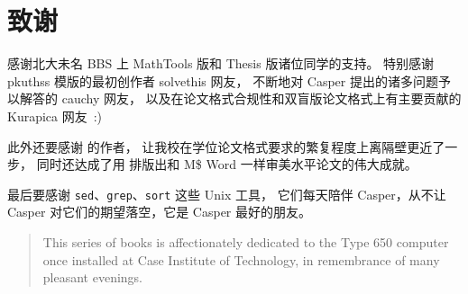 %
%
%
%

\chapter{致谢}

感谢北大未名 BBS 上 MathTools 版和 Thesis 版诸位同学的支持。
特别感谢 pkuthss 模版的最初创作者 solvethis 网友，
不断地对 Casper 提出的诸多问题予以解答的 cauchy 网友，
以及在论文格式合规性和双盲版论文格式上有主要贡献的 Kurapica 网友~:)

此外还要感谢 \parencite{pku-thesisstyle} 的作者，
让我校在学位论文格式要求的繁复程度上离隔壁更近了一步，
同时还达成了用  排版出和 M\$ Word 一样审美水平论文的伟大成就。

最后要感谢 \verb|sed|、\verb|grep|、\verb|sort| 这些 Unix 工具，
它们每天陪伴 Casper，从不让 Casper 对它们的期望落空，它是 Casper 最好的朋友。

\vspace{1em}
\begin{quotation}
\small This series of books is affectionately dedicated to the
Type 650 computer once installed at Case Institute of Technology,
in remembrance of many pleasant evenings.

\end{quotation}

